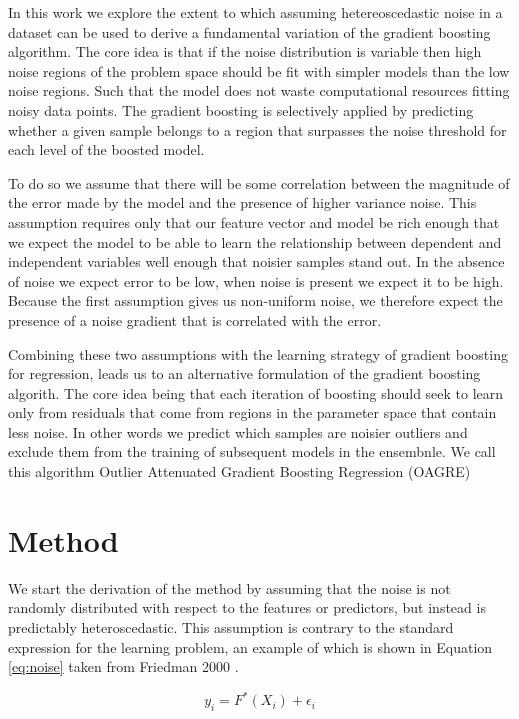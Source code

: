 \documentclass[12pt,a4paper]{article}
\begin{document}
In this work we explore the extent to which assuming hetereoscedastic noise in a dataset can be used
to derive a fundamental variation of the gradient boosting algorithm. 
The core idea is that if the noise distribution is variable then high noise regions of the problem space should be fit with simpler
models than the low noise regions. Such that the model does not waste computational resources fitting
noisy data points. The gradient boosting is selectively applied by predicting whether a given sample
belongs to a region that surpasses the noise threshold for each level of the boosted model.

To do so we assume that there will be some correlation between the magnitude of the error made
by the model and the presence of higher variance noise. This assumption requires only that our feature
vector and model be rich enough that we expect the model to be able to learn the
relationship between dependent and independent variables well enough that noisier samples stand out.
In the absence of noise we expect error to be low, when noise is present we expect it to be high.
Because the first assumption gives us non-uniform noise, we therefore expect the presence
of a noise gradient that is correlated with the error.

Combining these two assumptions with the learning strategy of gradient boosting for regression, leads us to an
alternative formulation of the gradient boosting algorith. The core idea being that each iteration of boosting should
seek to learn only from residuals that come from regions in the parameter space that contain less noise. In other
words we predict which samples are noisier outliers and exclude them from the training of subsequent models in the
ensembnle. We call this algorithm Outlier Attenuated Gradient Boosting Regression (OAGRE)

\section{Method}

We start the derivation of the method by assuming that the noise is not randomly distributed with respect to the
features or predictors, but instead is predictably heteroscedastic.
This assumption is contrary to the standard expression for the learning problem,
an example of which is shown in Equation \ref{eq:noise} taken from Friedman 2000 \cite{Friedman2000}.

\begin{equation}
y_i = F^*(X_i) + \epsilon_i
\label{eq:noise}
\end{equation}
\end{document}
